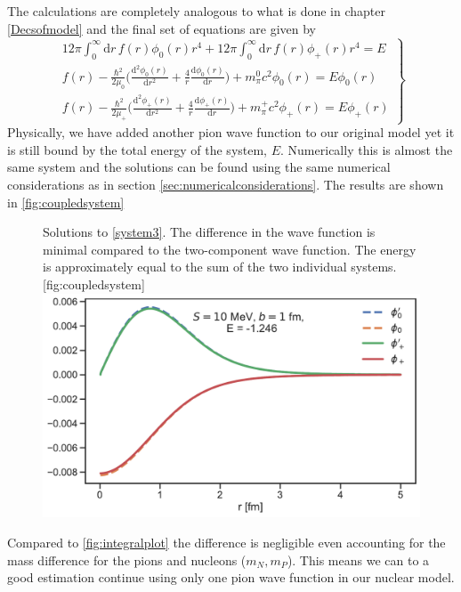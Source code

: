 The calculations are completely analogous to what is done in chapter \ref{Decsofmodel} and the final set of equations are given by
\begin{equation} \label{system3}
	\left.
	\begin{array}{ll}
		12\pi \int_0^\infty  \text{d}r \, f(r) \phi_0(r) r^4 + 12\pi \int_0^\infty  \text{d}r \, f(r) \phi_+(r) r^4 = E \\
		f(r) -\frac{\hbar^2}{2\mu_0}\Big(\frac{\text{d}^2 \phi_0(r)}{\text{d}r^2}+\frac{4}{r}\frac{\text{d}\phi_0(r)}{\text{d}r}\Big)+m_\pi^0 c^2 \phi_0(r) = E\phi_0(r) \\
		f(r) -\frac{\hbar^2}{2\mu_{+}}\Big(\frac{\text{d}^2 \phi_{+}(r)}{\text{d}r^2}+\frac{4}{r}\frac{\text{d}\phi_{+}(r)}{\text{d}r}\Big)+m_\pi^+ c^2 \phi_{+}(r) = E\phi_+(r)
	\end{array}
	\right \} 
\end{equation}
Physically, we have added another pion wave function to our original model yet it is still bound by the total energy of the system, $E$. Numerically this is almost the same system and the solutions can be found using the same numerical considerations as in section \ref{sec:numericalconsiderations}. The results are shown in \ref{fig:coupledsystem}
\begin{figure}[H]
	\begin{sidecaption}{Solutions to \eqref{system3}. The difference in the wave function is minimal compared to the two-component wave function. The energy is approximately equal to the sum of the two individual systems.}[fig:coupledsystem]
		\includegraphics[width=\linewidth]{Figures/Integralplot_CoupledSystem.pdf}
	\end{sidecaption}
\end{figure}
Compared to \ref{fig:integralplot} the difference is negligible even accounting for the mass difference for the pions and nucleons ($m_N, m_P$). This means we can to a good estimation continue using only one pion wave function in our nuclear model. 
